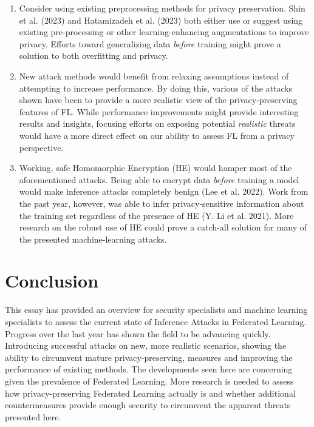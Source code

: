 \documentclass[
  compsoc]{IEEEtran}
\begin{document}
\begin{enumerate}
\def\labelenumi{\arabic{enumi}.}
\item
  Consider using existing preprocessing methods for privacy
  preservation. Shin et al. (2023) and Hatamizadeh et al. (2023) both
  either use or suggest using existing pre-processing or other
  learning-enhancing augmentations to improve privacy. Efforts toward
  generalizing data \emph{before} training might prove a solution to
  both overfitting and privacy.
\item
  New attack methods would benefit from relaxing assumptions instead of
  attempting to increase performance. By doing this, various of the
  attacks shown have been to provide a more realistic view of the
  privacy-preserving features of FL. While performance improvements
  might provide interesting results and insights, focusing efforts on
  exposing potential \emph{realistic} threats would have a more direct
  effect on our ability to assess FL from a privacy perspective.
\item
  Working, safe Homomorphic Encryption (HE) would hamper most of the
  aforementioned attacks. Being able to encrypt data \emph{before}
  training a model would make inference attacks completely benign (Lee
  et al. 2022). Work from the past year, however, was able to infer
  privacy-sensitive information about the training set regardless of the
  presence of HE (Y. Li et al. 2021). More research on the robust use of
  HE could prove a catch-all solution for many of the presented
  machine-learning attacks.
\end{enumerate}

\hypertarget{conclusion}{%
\section{Conclusion}\label{conclusion}}

This essay has provided an overview for security specialists and machine
learning specialists to assess the current state of Inference Attacks in
Federated Learning. Progress over the last year has shown the field to
be advancing quickly. Introducing successful attacks on new, more
realistic scenarios, showing the ability to circumvent mature
privacy-preserving, measures and improving the performance of existing
methods. The developments seen here are concerning given the prevalence
of Federated Learning. More research is needed to assess how
privacy-preserving Federated Learning actually is and whether additional
countermeasures provide enough security to circumvent the apparent
threats presented here.
\end{document}
